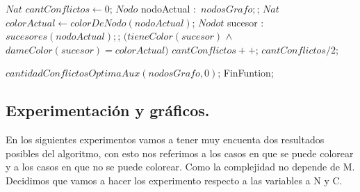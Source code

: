 \begin{codebox}
	\li $Nat$ $cantConflictos \leftarrow 0$;
	\li	\For $Nodo$ nodoActual $:$ \To $ nodosGrafo; $; \Comment{} \Do
	\li		$ Nat$ $colorActual \leftarrow colorDeNodo(nodoActual)$;
	\li			\For $Nodot$ sucesor $:$ \To $ sucesores(nodoActual); $; \Comment{} \Do 
	\li				\If$(tieneColor(sucesor)$ $\land$ $dameColor(sucesor) = colorActual)$ \Then $cantConflictos++$;
					\End
				\End		 
		\End
	\li \Return  $cantConflictos/2$;%
\end{codebox}

\begin{codebox}
	\li $cantidadConflictosOptimaAux(nodosGrafo,0)$;
	\li FinFuntion;
\end{codebox}










	
\newpage
\subsection{Experimentación y gráficos.}
En los siguientes experimentos vamos a tener muy encuenta dos resultados posibles del algoritmo, con esto nos referimos a los casos en que se puede colorear y a los casos en que no se puede colorear. \newline
Como la complejidad no depende de M. Decidimos que vamos a hacer los experimento respecto a las variables a N y C.
\vspace*{0.3cm}



